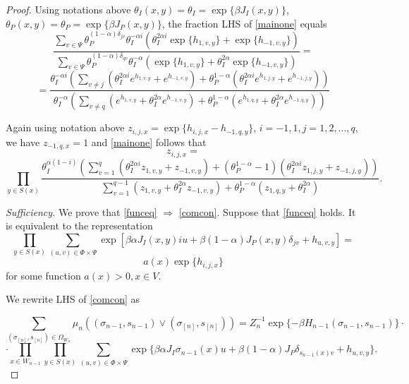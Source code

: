 \documentclass[10pt,a4paper]{amsart}
\begin{document}
\begin{proof}
Using notations above $\theta_{I}(x,y)=\theta_{I}=\exp\{\beta J_{I}(x,y)\}$, $\theta_{P}(x,y)=\theta_{P}=\exp\{\beta J_{P}(x,y)\}$, the fraction LHS of \eqref{mainone} equals
$$\frac{\sum\limits_{v\in \Psi}\theta_{P}^{(1-\alpha)\delta_{jv}}\theta_{I}^{-\alpha i}\left(\theta_{I}^{2\alpha i}\exp\{h_{1,v,y}\}+\exp\{h_{-1,v,y}\} \right)}{\sum\limits_{v\in \Psi}\theta_{P}^{(1-\alpha)\delta_{qv} }\theta_{I}^{-\alpha }\left( \exp\{ h_{1,v,y}\}+ \theta_{I}^{2\alpha }\exp\{h_{-1,v,y}\} \right)}
=$$
$$=\frac{\theta_{I}^{-\alpha i}\left(\sum\limits_{v\neq j}\left(\theta_{I}^{2\alpha i}e^{h_{1,v,y}}+e^{h_{-1,v,y}} \right)+\theta_{P}^{1-\alpha} \left(\theta_{I}^{2\alpha i}e^{h_{1,j,y}}+e^{h_{-1,j,y}}\right)\right)}{\theta_{I}^{-\alpha}\left(\sum\limits_{v\neq q}\left(e^{h_{1,v,y}}+\theta_{I}^{2\alpha}e^{h_{-1,v,y}} \right)+\theta_{P}^{1-\alpha}\left(e^{h_{1,q,y}}+\theta_{I}^{2\alpha}e^{h_{-1,q,y}}\right)\right) }$$

Again using notation above $z_{i,j,x}=\exp\{h_{i,j,x}-h_{-1,q,y}\}$, $i=-1,1, j=1,2,...,q$, we have  $z_{-1,q,x}=1$ and
\eqref{mainone} follows that
$$z_{i,j,x}=$$
$$
\prod\limits_{y\in S(x)}\frac{\theta_{I}^{\alpha (1-i)}\left(\sum\limits_{v=1}^{q}\left(\theta_{I}^{2\alpha i}z_{1,v,y}+z_{-1,v,y} \right)+\left(\theta_{P}^{1-\alpha}-1\right)\left(\theta_{I}^{2\alpha i}z_{1,j,y}+z_{-1,j,y}\right)\right) }{\sum\limits_{v=1}^{q-1}\left(z_{1,v,y}+\theta_{I}^{2\alpha }z_{-1,v,y} \right)+\theta_{P}^{1-\alpha}\left(z_{1,q,y}+\theta_{I}^{2\alpha }\right)}.
$$

\emph{Sufficiency.} We prove that \eqref{funceq} $\Rightarrow$ \eqref{comcon}. Suppose that \eqref{funceq} holds. It is equivalent to the representation
$$\prod\limits_{y\in S(x)}\sum\limits_{(u,v)\in \Phi\times\Psi}\exp\left[\beta \alpha  J_{I}(x,y)iu
+\beta (1-\alpha) J_{P}(x,y)\delta_{jv}+ h_{u,v,y}\right]=$$
\begin{equation}\label{cc9}
a(x)\exp\{h_{i,j,x}\}
\end{equation}
for some function $a(x)>0, x\in V$.

We rewrite LHS of \eqref{comcon} as

$$\sum\limits_{(\sigma_{[n]}, s_{[n]})  \in {\Omega _{{W_n}}}} \mu_{n}((\sigma_{n-1}, s_{n-1}) \vee (\sigma_{[n]}, s_{[n]})) =Z_n^{-1}\exp\{-\beta H_{n-1}(\sigma_{n-1},s_{n-1})\}\cdot$$
\begin{equation}\label{cc12}
\cdot\prod_{x\in W_{n-1}}\prod_{y\in S(x)}\sum\limits_{(u,v)\in \Phi\times\Psi}\exp\{\beta \alpha  J_{I}\sigma_{n-1}(x)u
+\beta (1-\alpha) J_{P}\delta_{s_{n-1}(x)v}+ h_{u,v,y}\}.
\end{equation}


\end{proof}
\end{document}
